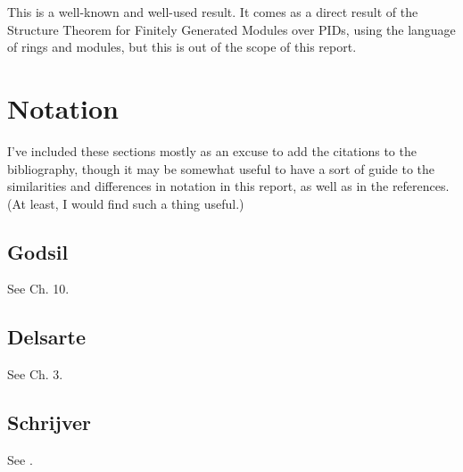 \documentclass{report}
\begin{document}
    This is a well-known and well-used result.  It comes as a direct result of
    the Structure Theorem for Finitely Generated Modules over PIDs, using the
    language of rings and modules, but this is out of the scope of this report.

\chapter{Notation}
  I've included these sections mostly as an excuse to add the citations to the
  bibliography, though it may be somewhat useful to have a sort of guide to the
  similarities and differences in notation in this report, as well as in the
  references.  (At least, I would find such a thing useful.)

  \section{Godsil}
    See \cite{godsil} Ch. 10.

  \section{Delsarte}
    See \cite{delsarte} Ch. 3.

  \section{Schrijver}
    See \cite{schrijver}.

\printbibliography[heading=bibintoc]
\end{document}
